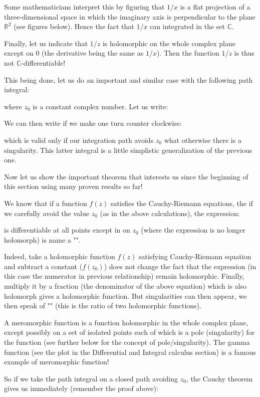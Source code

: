	Some mathematicians interpret this by figuring that $1/x$ is a flat projection of a three-dimensional space in which the imaginary axis is perpendicular to the plane $\mathbb{R}^2$ (see figures below). Hence the fact that $1/x$ can integrated in the set $\mathbb{C}$.
	
	Finally, let us indicate that $1/z$ is holomorphic on the whole complex plane except on $0$ (the derivative being the same as $1/x$). Then the function $1/z$ is thus not $\mathbb{C}$-differentiable!
	
	This being done, let us do an important and similar case with the following path integral:
	
	where $z_0$ is a constant complex number. Let us write:
	
	We can then write if we make one turn counter clockwise:
	
	which is valid only if our integration path avoids $z_0$ what otherwise there is a singularity. This latter integral is a little simplistic generalization of the previous one.
	
	Now let us show the important theorem that interests us since the beginning of this section using many proven results so far!
	
	We know that if a function $f (z)$ satisfies the Cauchy-Riemann equations, the if we carefully avoid the value $z_0$ (as in the above calculations), the expression:
	
	is differentiable at all points except in on $z_0$ (where the expression is no longer holomorph) is name a "".

	Indeed, take a holomorphic function $f (z)$ satisfying Cauchy-Riemann equation and subtract a constant ($f(z_0)$) does not change the fact that the expression (in this case the numerator in previous relationship) remain holomorphic. Finally, multiply it by a fraction (the denominator of the above equation) which is also holomorph gives a holomorphic function. But singularities can then appear, we then speak of "" (this is the ratio of two holomorphic functions).
	\begin{tcolorbox}[title=Remark,colframe=black,arc=10pt]
	A meromorphic function is a function holomorphic in the whole complex plane, except possibly on a set of isolated points each of which is a pole (singularity) for the function (see further below for the concept of pole/singularity). The gamma function (see the plot in the Differential and Integral calculus section) is a famous example of meromorphic function!
	\end{tcolorbox}	
	So if we take the path integral on a closed path avoiding $z_0$, the Cauchy theorem gives us immediately (remember the proof above):
	
